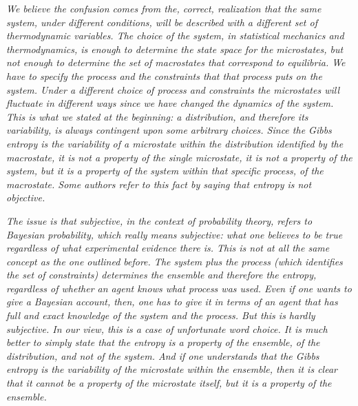 \documentclass[11pt]{article}
\begin{document}
\emph{We believe the confusion comes from the, correct, realization that the same system, under different conditions, will be described with a different set of thermodynamic variables. The choice of the system, in statistical mechanics and thermodynamics, is enough to determine the state space for the microstates, but not enough to determine the set of macrostates that correspond to equilibria. We have to specify the process and the constraints that that process puts on the system. Under a different choice of process and constraints the microstates will fluctuate in different ways since we have changed the dynamics of the system. This is what we stated at the beginning: a distribution, and therefore its variability, is always contingent upon some arbitrary choices. Since the Gibbs entropy is the variability of a microstate within the distribution identified by the macrostate, it is not a property of the single microstate, it is not a property of the system, but it is a property of the system within that specific process, of the macrostate. Some authors refer to this fact by saying that entropy is not objective.}

\emph{The issue is that subjective, in the context of probability theory, refers to Bayesian probability, which really means subjective: what one believes to be true regardless of what experimental evidence there is. This is not at all the same concept as the one outlined before. The system plus the process (which identifies the set of constraints) determines the ensemble and therefore the entropy, regardless of whether an agent knows what process was used. Even if one wants to give a Bayesian account, then, one has to give it in terms of an agent that has full and exact knowledge of the system and the process. But this is hardly subjective. In our view, this is a case of unfortunate word choice. It is much better to simply state that the entropy is a property of the ensemble, of the distribution, and not of the system. And if one understands that the Gibbs entropy is the variability of the microstate within the ensemble, then it is clear that it cannot be a property of the microstate itself, but it is a property of the ensemble.}
\end{document}
